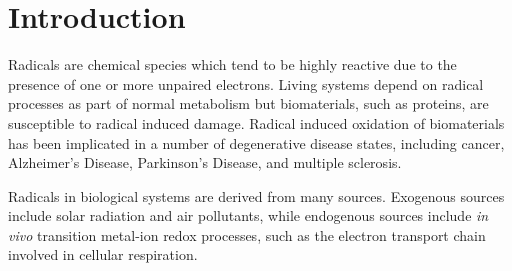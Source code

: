 
 \chapter{Introduction}

Radicals are chemical species which tend to be highly reactive due to the presence of one or more unpaired electrons. Living systems depend on radical processes as part of normal metabolism\cite{Halliwell2015} but biomaterials, such as proteins, are susceptible to radical induced damage. Radical induced oxidation of biomaterials has been implicated in a number of degenerative disease states, including cancer, Alzheimer's Disease, Parkinson's Disease, and multiple sclerosis.\cite{Barnham2004, Valko2007, Hwang2013, Halliwell2007}

Radicals in biological systems are derived from many sources. Exogenous sources include solar radiation and air pollutants, while endogenous sources include \emph{in vivo} transition metal-ion redox processes, such as the electron transport chain involved in cellular respiration.\cite{Turren2003}
